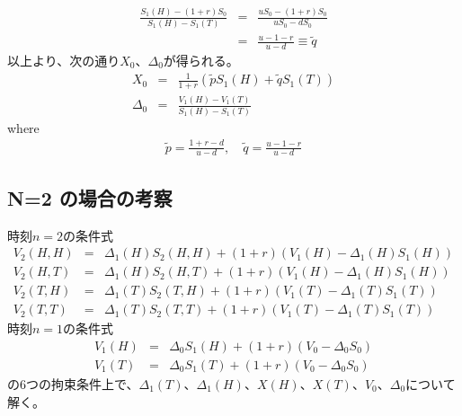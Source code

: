 \documentclass[10pt]{article}
\theoremstyle{plain}
\begin{document}
\begin{eqnarray}
\frac{S_1(H)-(1+r)S_0}{S_1(H)-S_1(T)}&=&\frac{uS_0-(1+r)S_0}{uS_0-dS_0}\\
&=&\frac{u-1-r}{u-d} \equiv \tilde{q}
\end{eqnarray}
以上より、次の通り$X_0$、$\Delta_0$が得られる。
\begin{eqnarray}
    X_0     &=& \frac{1}{1+r}\left( \tilde{p}S_1(H)+\tilde{q}S_1(T) \right) \\
    \Delta_0&=& \frac{V_1(H)-V_1(T)}{S_1(H)-S_1(T)}
\end{eqnarray}
where
\begin{eqnarray}
\tilde{p}=\frac{1+r-d}{u-d},\quad  \tilde{q}=\frac{u-1-r}{u-d}
\end{eqnarray}
\hrulefill \hspace{5cm}

\subsection{N=2 の場合の考察}
時刻$n=2$の条件式
\begin{eqnarray}
    V_2(H,H) &=& \Delta_1(H) S_2(H,H) + (1+r)(V_1(H) - \Delta_1(H) S_1(H)) \\
    V_2(H,T) &=& \Delta_1(H) S_2(H,T) + (1+r)(V_1(H) - \Delta_1(H) S_1(H)) \\
    V_2(T,H) &=& \Delta_1(T) S_2(T,H) + (1+r)(V_1(T) - \Delta_1(T) S_1(T)) \label{2th}\\
    V_2(T,T) &=& \Delta_1(T) S_2(T,T) + (1+r)(V_1(T) - \Delta_1(T) S_1(T)) \label{2tt}
\end{eqnarray}
時刻$n=1$の条件式
\begin{eqnarray}
V_1(H) &=& \Delta_0 S_1(H) + (1+r)\left(V_0 -\Delta_0 S_0 \right) \\
V_1(T) &=& \Delta_0 S_1(T) + (1+r)\left(V_0 -\Delta_0 S_0 \right)
\end{eqnarray}
の6つの拘束条件上で、$\Delta_1(T)$、$\Delta_1(H)$、$X(H)$、$X(T)$、$V_0$、$\Delta_0$について解く。\\
\end{document}
